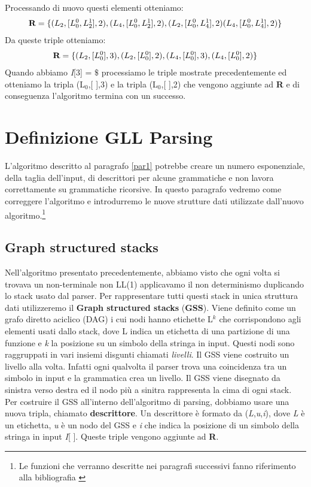 Processando di nuovo questi elementi otteniamo:
\begin{align}
	\textbf{R} = \{ (L_{2},[L_0^{0},L_2^{1}],2), (L_{4},[L_0^{0},L_2^{1}],2), (L_{2},[L_0^{0},L_4^{1}],2) (L_{4},[L_0^{0},L_4^{1}],2) \} \notag
\end{align}
Da queste triple otteniamo:
\begin{align}
 	\textbf{R} = \{ (L_{2},[L_0^{0}],3), (L_{2},[L_0^{0}],2), (L_{4},[L_0^{0}],3), (L_{4},[L_0^{0}],2) \} \notag
\end{align}
Quando abbiamo \textit{I}[3] = $\$$ processiamo le triple mostrate precedentemente ed otteniamo la tripla (L$_{0}$,[ ],3) e la tripla (L$_{0}$,[ ],2) che vengono aggiunte ad \textbf{R} e di conseguenza l'algoritmo termina con un successo.
\section{Definizione GLL Parsing}
L'algoritmo descritto al paragrafo \ref{par1} potrebbe creare un numero esponenziale, della taglia dell'input, di descrittori per alcune grammatiche e non lavora correttamente su grammatiche ricorsive. In questo paragrafo vedremo come correggere l'algoritmo e introdurremo le nuove strutture dati utilizzate dall'nuovo algoritmo.\footnote{Le funzioni che verranno descritte nei paragrafi successivi fanno riferimento alla bibliografia \cite{pubblicazione: scott}}
\subsection{Graph structured stacks}
Nell'algoritmo presentato precedentemente, abbiamo visto che ogni volta si trovava un non-terminale non LL(1) applicavamo il non determinismo duplicando lo stack usato dal parser. Per rappresentare tutti questi stack in unica struttura dati utilizzeremo il \textbf{Graph structured stacks} (\textbf{GSS}). Viene definito \cite{tesi: lr} come un grafo diretto aciclico (DAG) i cui nodi hanno etichette L$^{k}$ che corrispondono agli elementi usati dallo stack, dove L indica un etichetta di una partizione di una funzione e \textit{k} la posizione su un simbolo della stringa in input. Questi nodi sono raggruppati in vari insiemi disgunti chiamati \textit{livelli}. Il GSS viene costruito un livello alla volta. Infatti ogni qualvolta il parser trova una coincidenza tra un simbolo in input e la grammatica crea un livello. Il GSS viene disegnato da sinistra verso destra ed il nodo più a sinitra rappresenta la cima di ogni stack. Per costruire il GSS all'interno dell'algoritmo di parsing, dobbiamo usare una nuova tripla, chiamato \textbf{descrittore}. Un descrittore è formato da (\textit{L},\textit{u},\textit{i}), dove \textit{L} è un etichetta, \textit{u} è un nodo del GSS e \textit{i} che indica la posizione di un simbolo della stringa in input \textit{I}[ ]. Queste triple vengono aggiunte ad \textbf{R}.
